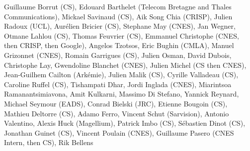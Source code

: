 Guillaume Borrut (CS), Edouard Barthelet (Telecom Bretagne and Thales Communications), Mickael Savinaud (CS), Aik Song Chia (CRISP), Julien Radoux (UCL), Aur\'elien Bricier (CS), Stephane May (CNES), Jan Wegner, Otmane Lahlou (CS), Thomas Feuvrier (CS), Emmanuel Christophe (CNES, then CRISP, then Google), Angelos Tzotsos, Eric Bughin (CMLA), Manuel Grizonnet (CNES), Romain Garrigues (CS), Julien Osman, David Dubois, Christophe Lay, Gwendoline Blanchet (CNES), Julien Michel (CS then CNES), Jean-Guilhem Cailton (Ark\'emie), Julien Malik (CS), Cyrille Valladeau (CS), Caroline Ruffel (CS), Tishampati Dhar, Jordi Inglada (CNES), Miarintsoa Ramanantsimiavona, Amit Kulkarni, Massimo Di Stefano, Yannick Reynard, Michael Seymour (EADS), Conrad Bielski (JRC), Etienne Bougoin (CS), Mathieu Deltorre (CS), Adamo Ferro, Vincent Schut (Sarvision), Antonio Valentino, Alexis Huck (Magellium), Patrick Imbo (CS), S\'ebastien Dinot (CS), Jonathan Guinet (CS), Vincent Poulain (CNES), Guillaume Pasero (CNES Intern, then CS), Rik Bellens